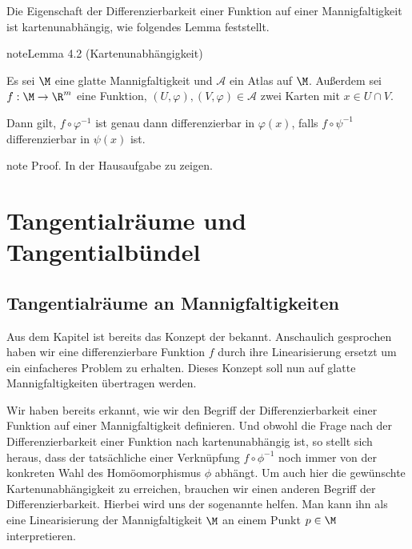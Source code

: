 \documentclass[letterpaper,10pt,german]{jupyterBook}
\begin{document}
\sphinxAtStartPar
Die Eigenschaft der Differenzierbarkeit einer Funktion auf einer Mannigfaltigkeit ist kartenunabhängig, wie folgendes Lemma feststellt.
\label{manifolds/manifolds_prelim:lem:differenzierbarkeitKartenunabhaengig}
\begin{sphinxadmonition}{note}{Lemma 4.2 (Kartenunabhängigkeit)}



\sphinxAtStartPar
Es sei \(\M\) eine glatte Mannigfaltigkeit und \(\mathcal{A}\) ein Atlas auf \(\M\).
Außerdem sei \(f:\M \to \R^m\) eine Funktion, \((U,\varphi), (V,\varphi)\in \mathcal{A}\) zwei Karten mit \(x \in U\cap V\).

\sphinxAtStartPar
Dann gilt, \(f\circ\varphi^{-1}\) ist genau dann differenzierbar in \(\varphi(x)\), falls \(f\circ\psi^{-1}\) differenzierbar in \(\psi(x)\) ist.
\end{sphinxadmonition}

\begin{sphinxadmonition}{note}
\sphinxAtStartPar
Proof. In der Hausaufgabe zu zeigen.
\end{sphinxadmonition}


\section{Tangentialräume und Tangentialbündel}
\label{\detokenize{manifolds/tangential:tangentialraume-und-tangentialbundel}}\label{\detokenize{manifolds/tangential::doc}}

\subsection{Tangentialräume an Mannigfaltigkeiten}
\label{\detokenize{manifolds/tangential:tangentialraume-an-mannigfaltigkeiten}}
\sphinxAtStartPar
Aus dem Kapitel {\hyperref[\detokenize{odestability/ruhelagen:s-linearisierung-ruhelage}]{}} ist bereits das Konzept der  bekannt.
Anschaulich gesprochen haben wir eine differenzierbare Funktion \(f\) durch ihre Linearisierung ersetzt um ein einfacheres Problem zu erhalten.
Dieses Konzept soll nun auf glatte Mannigfaltigkeiten übertragen werden.

\sphinxAtStartPar
Wir haben bereits erkannt, wie wir den Begriff der Differenzierbarkeit einer Funktion auf einer Mannigfaltigkeit definieren.
Und obwohl die Frage nach der Differenzierbarkeit einer Funktion nach {\hyperref[\detokenize{manifolds/manifolds_prelim:lem:differenzierbarkeitKartenunabhaengig}]{}} kartenunabhängig ist, so stellt sich heraus, dass der tatsächliche  einer Verknüpfung \(f \circ\phi^{-1}\) noch immer von der konkreten Wahl des Homöomorphismus \(\phi\) abhängt.
Um auch hier die gewünschte Kartenunabhängigkeit zu erreichen, brauchen wir einen anderen Begriff der Differenzierbarkeit.
Hierbei wird uns der sogenannte  helfen.
Man kann ihn als eine Linearisierung der Mannigfaltigkeit \(\M\) an einem Punkt \(p\in\M\) interpretieren.
\end{document}
